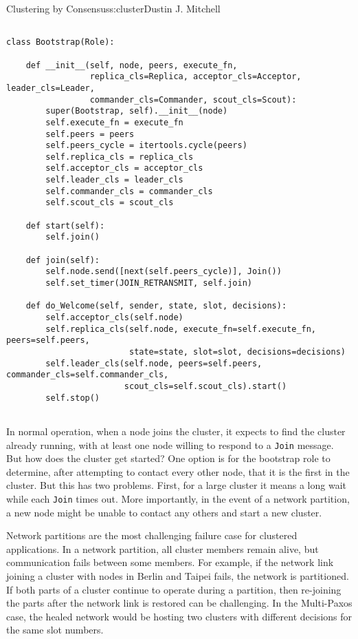 \begin{aosachapter}{Clustering by Consensus}{s:cluster}{Dustin J. Mitchell}
\begin{verbatim}

class Bootstrap(Role):

    def __init__(self, node, peers, execute_fn,
                 replica_cls=Replica, acceptor_cls=Acceptor, leader_cls=Leader,
                 commander_cls=Commander, scout_cls=Scout):
        super(Bootstrap, self).__init__(node)
        self.execute_fn = execute_fn
        self.peers = peers
        self.peers_cycle = itertools.cycle(peers)
        self.replica_cls = replica_cls
        self.acceptor_cls = acceptor_cls
        self.leader_cls = leader_cls
        self.commander_cls = commander_cls
        self.scout_cls = scout_cls

    def start(self):
        self.join()

    def join(self):
        self.node.send([next(self.peers_cycle)], Join())
        self.set_timer(JOIN_RETRANSMIT, self.join)

    def do_Welcome(self, sender, state, slot, decisions):
        self.acceptor_cls(self.node)
        self.replica_cls(self.node, execute_fn=self.execute_fn, peers=self.peers,
                         state=state, slot=slot, decisions=decisions)
        self.leader_cls(self.node, peers=self.peers, commander_cls=self.commander_cls,
                        scout_cls=self.scout_cls).start()
        self.stop()
    
\end{verbatim}

\label{seed}

In normal operation, when a node joins the cluster, it expects to find
the cluster already running, with at least one node willing to respond
to a \texttt{Join} message. But how does the cluster get started? One
option is for the bootstrap role to determine, after attempting to
contact every other node, that it is the first in the cluster. But this
has two problems. First, for a large cluster it means a long wait while
each \texttt{Join} times out. More importantly, in the event of a
network partition, a new node might be unable to contact any others and
start a new cluster.

Network partitions are the most challenging failure case for clustered
applications. In a network partition, all cluster members remain alive,
but communication fails between some members. For example, if the
network link joining a cluster with nodes in Berlin and Taipei fails,
the network is partitioned. If both parts of a cluster continue to
operate during a partition, then re-joining the parts after the network
link is restored can be challenging. In the Multi-Paxos case, the healed
network would be hosting two clusters with different decisions for the
same slot numbers.


\end{aosachapter}
